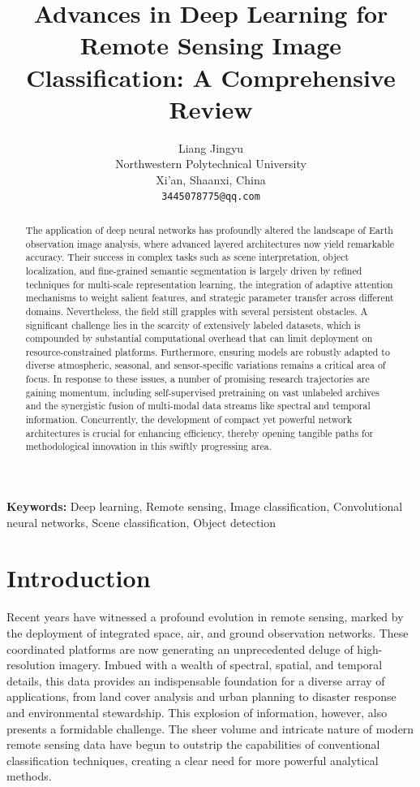 \documentclass[12pt,a4paper]{article}
\title{\fontsize{14}{17}\selectfont\textbf{Advances in Deep Learning for Remote Sensing Image Classification: A Comprehensive Review}}
\author{Liang Jingyu\\
Northwestern Polytechnical University\\
Xi'an, Shaanxi, China\\
\texttt{3445078775@qq.com}}
\date{}
\begin{document}
\maketitle

\begin{abstract}
The application of deep neural networks has profoundly altered the landscape of Earth observation image analysis, where advanced layered architectures now yield remarkable accuracy. Their success in complex tasks such as scene interpretation, object localization, and fine-grained semantic segmentation is largely driven by refined techniques for multi-scale representation learning, the integration of adaptive attention mechanisms to weight salient features, and strategic parameter transfer across different domains. Nevertheless, the field still grapples with several persistent obstacles. A significant challenge lies in the scarcity of extensively labeled datasets, which is compounded by substantial computational overhead that can limit deployment on resource-constrained platforms. Furthermore, ensuring models are robustly adapted to diverse atmospheric, seasonal, and sensor-specific variations remains a critical area of focus. In response to these issues, a number of promising research trajectories are gaining momentum, including self-supervised pretraining on vast unlabeled archives and the synergistic fusion of multi-modal data streams like spectral and temporal information. Concurrently, the development of compact yet powerful network architectures is crucial for enhancing efficiency, thereby opening tangible paths for methodological innovation in this swiftly progressing area.
\end{abstract}

\textbf{Keywords:} Deep learning, Remote sensing, Image classification, Convolutional neural networks, Scene classification, Object detection

\section{Introduction}
\label{sec:introduction}

Recent years have witnessed a profound evolution in remote sensing, marked by the deployment of integrated space, air, and ground observation networks. These coordinated platforms are now generating an unprecedented deluge of high-resolution imagery. Imbued with a wealth of spectral, spatial, and temporal details, this data provides an indispensable foundation for a diverse array of applications, from land cover analysis and urban planning to disaster response and environmental stewardship. This explosion of information, however, also presents a formidable challenge. The sheer volume and intricate nature of modern remote sensing data have begun to outstrip the capabilities of conventional classification techniques, creating a clear need for more powerful analytical methods.
\end{document}
